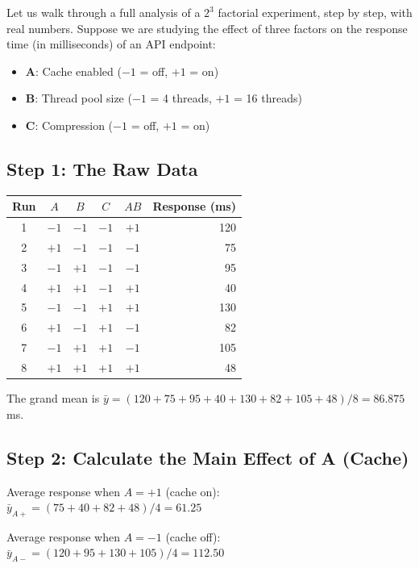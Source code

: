 \documentclass[11pt]{book}
\begin{document}
Let us walk through a full analysis of a $2^3$ factorial experiment, step by step,
with real numbers. Suppose we are studying the effect of three factors on the
response time (in milliseconds) of an API endpoint:

\begin{itemize}[nosep]
\item \textbf{A}: Cache enabled ($-1$ = off, $+1$ = on)
\item \textbf{B}: Thread pool size ($-1$ = 4 threads, $+1$ = 16 threads)
\item \textbf{C}: Compression ($-1$ = off, $+1$ = on)
\end{itemize}

\subsection{Step 1: The Raw Data}

\begin{center}
\begin{tabular}{cccccr}
\toprule
Run & $A$ & $B$ & $C$ & $AB$ & Response (ms) \\
\midrule
1 & $-1$ & $-1$ & $-1$ & $+1$ & 120 \\
2 & $+1$ & $-1$ & $-1$ & $-1$ & 75 \\
3 & $-1$ & $+1$ & $-1$ & $-1$ & 95 \\
4 & $+1$ & $+1$ & $-1$ & $+1$ & 40 \\
5 & $-1$ & $-1$ & $+1$ & $+1$ & 130 \\
6 & $+1$ & $-1$ & $+1$ & $-1$ & 82 \\
7 & $-1$ & $+1$ & $+1$ & $-1$ & 105 \\
8 & $+1$ & $+1$ & $+1$ & $+1$ & 48 \\
\bottomrule
\end{tabular}
\end{center}

The grand mean is $\bar{y} = (120+75+95+40+130+82+105+48)/8 = 86.875$ ms.

\subsection{Step 2: Calculate the Main Effect of A (Cache)}

Average response when $A = +1$ (cache on): $\bar{y}_{A+} = (75 + 40 + 82 + 48)/4 = 61.25$

Average response when $A = -1$ (cache off): $\bar{y}_{A-} = (120 + 95 + 130 + 105)/4 = 112.50$
\end{document}
